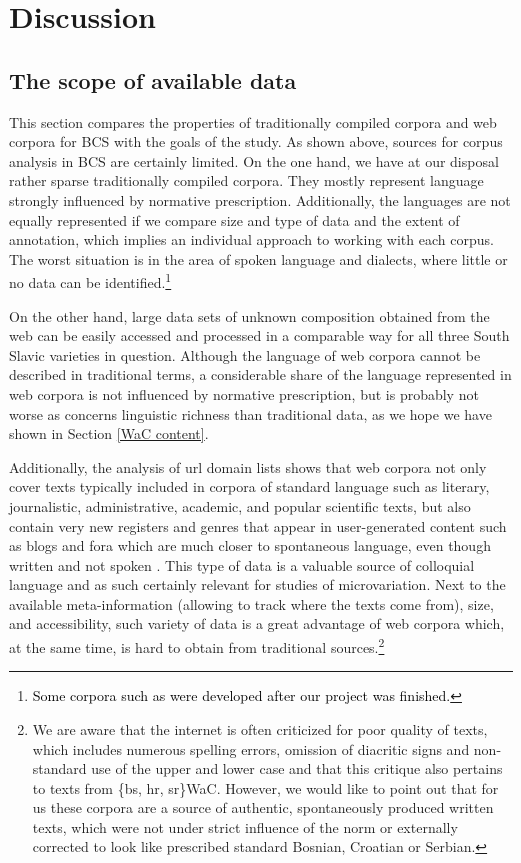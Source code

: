 \section{Discussion}
\label{Discussion}
\subsection{The scope of available data}

This section compares the properties of traditionally compiled corpora and web corpora for BCS  with the goals of the study. As shown above, sources for corpus analysis in BCS are certainly limited. On the one hand, we have at our disposal rather sparse traditionally compiled corpora. They mostly represent language strongly influenced by normative prescription. Additionally, the languages are not equally represented if we compare size and type of data and the extent of annotation, which implies an individual approach to working with each corpus. The worst situation is in the area of spoken language and dialects, where little or no data can be identified.\footnote{\textcolor{black}{Some corpora such as \citet[]{Vukovic21} were developed after our project was finished.}}

On the other hand, large data sets of unknown composition obtained from the web can be easily accessed and processed in a comparable way for all three South Slavic varieties in question. Although the language of web corpora cannot be described in traditional terms, a considerable share of the language represented in web corpora is not influenced by normative prescription, but is probably not worse as concerns linguistic richness than traditional data, as we hope we have shown in Section \ref{WaC content}. 

Additionally, the analysis of url domain lists shows that web corpora not only cover texts typically included in corpora of standard language such as literary, journalistic, administrative,  academic, and popular scientific texts, but also contain very new registers and genres that appear in user-generated content such as blogs and fora which are much closer to spontaneous language, even though written and not spoken \citep[4]{SchafferBildhauer13}. This type of data is a valuable source of colloquial language and as such certainly relevant for studies of microvariation. Next to the available meta-information (allowing to track where the texts come from), size, and accessibility, such variety of data is a great advantage of web corpora  which, at the same time, is hard to obtain from traditional sources.\footnote{We are aware that the internet is often criticized for poor quality of texts, which includes numerous spelling errors, omission of diacritic signs and non-standard use of the upper and lower case and that this critique also pertains to texts from \{bs, hr, sr\}WaC. However, we would like to point out that for us these corpora are a source of authentic, spontaneously produced written texts, which were not under strict influence of the norm or externally corrected to look like prescribed standard Bosnian, Croatian or Serbian.}

